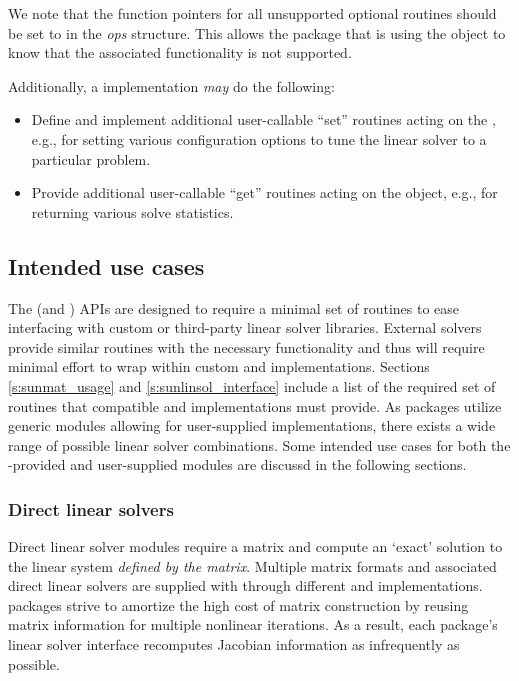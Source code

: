 We note that the function pointers for all unsupported optional
routines should be set to  in the \emph{ops} structure.  This
allows the {\sundials} package that is using the {\sunlinsol} object
to know that the associated functionality is not supported.

Additionally, a {\sunlinsol} implementation \emph{may} do the
following:
\begin{itemize}
\item Define and implement additional user-callable ``set'' routines
  acting on the , e.g., for setting various
  configuration options to tune the linear solver to a
  particular problem.
\item Provide additional user-callable ``get'' routines acting on the
   object, e.g., for returning various solve
  statistics.
\end{itemize}


\subsection{Intended use cases}\label{ss:sunlinsol_intended}

The {\sunlinsol} (and {\sunmatrix}) APIs are designed to require a minimal set
of routines to ease interfacing with custom or third-party linear solver
libraries. External solvers provide similar routines with
the necessary functionality and thus will require minimal effort to wrap within
custom {\sunmatrix} and {\sunlinsol} implementations. Sections
\ref{s:sunmat_usage} and \ref{s:sunlinsol_interface} include a list of the required set
of routines that compatible {\sunmatrix} and {\sunlinsol} implementations must
provide. As {\sundials} packages utilize generic {\sunlinsol} modules allowing
for user-supplied  implementations, there exists a wide
range of possible linear solver combinations. Some intended use cases for both
the {\sundials}-provided and user-supplied {\sunlinsol} modules are discussd in
the following sections.

\subsubsection*{Direct linear solvers}

Direct linear solver modules require a matrix and compute an `exact' solution to
the linear system \textit{defined by the matrix}. Multiple matrix formats and
associated direct linear solvers are supplied with {\sundials} through different
{\sunmatrix} and {\sunlinsol} implementations. {\sundials} packages strive to
amortize the high cost of matrix construction by reusing matrix information for
multiple nonlinear iterations. As a result, each package's linear solver
interface recomputes Jacobian information as infrequently as possible.

